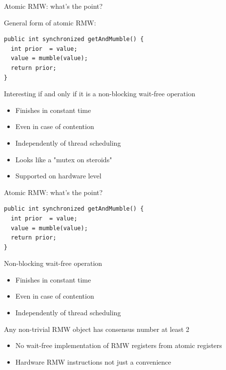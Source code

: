 \begin{frame}[fragile]{Atomic RMW: what's the point?}

General form of atomic RMW:
\begin{verbatim}
public int synchronized getAndMumble() {
  int prior  = value;
  value = mumble(value);
  return prior;
}
\end{verbatim}

\pause
Interesting if and only if it is a non-blocking wait-free operation
\pause
\begin{itemize}
  \item Finishes in constant time
  \item Even in case of contention
  \item Independently of thread scheduling
  \pause
  \item Looks like a "mutex on steroids"
  \pause
  \item Supported on hardware level
\end{itemize}

\end{frame}


\begin{frame}{Atomic RMW: what's the point?}

\begin{verbatim}
public int synchronized getAndMumble() {
  int prior  = value;
  value = mumble(value);
  return prior;
}
\end{verbatim}

Non-blocking wait-free operation
\begin{itemize}
  \item Finishes in constant time
  \item Even in case of contention
  \item Independently of thread scheduling
\end{itemize}

\pause

\begin{theorem}
Any non-trivial RMW object has consensus number at least 2
\end{theorem}

\pause

\begin{itemize}
  \item No wait-free implementation of RMW registers from atomic registers
  \item Hardware RMW instructions not just a convenience
\end{itemize}

\end{frame}


